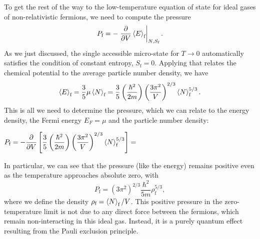 To get the rest of the way to the low-temperature equation of state for ideal gases of non-relativistic fermions, we need to compute the pressure
\begin{equation*}
  P_{\text{f}} = -\left. \frac{\partial }{\partial V} \left\langle E \right\rangle_{\text{f}} \right|_{N, S_{\text{f}}}.
\end{equation*}
As we just discussed, the single accessible micro-state for $T \to 0$ automatically satisfies the condition of constant entropy, $S_{\text{f}} = 0$.
Applying  that relates the chemical potential to the average particle number density, we have
\begin{equation*}
  \left\langle E \right\rangle_{\text{f}} = \frac{3}{5} \mu \left\langle N \right\rangle_{\text{f}} = \frac{3}{5} \left(\frac{\hbar^2}{2m}\right) \left(\frac{3\pi^2}{V}\right)^{2 / 3} \left\langle N \right\rangle_{\text{f}}^{5 / 3}.
\end{equation*}
\newpage %
\noindent This is all we need to determine the pressure, which we can relate to the energy density, the Fermi energy $E_F = \mu$ and the particle number density:
\begin{mdframed}
  $\displaystyle P_{\text{f}} = -\frac{\partial }{\partial V} \left[\frac{3}{5} \left(\frac{\hbar^2}{2m}\right) \left(\frac{3\pi^2}{V}\right)^{2 / 3} \left\langle N \right\rangle_{\text{f}}^{5 / 3}\right] = $ \\[100 pt]
\end{mdframed}
In particular, we can see that the pressure (like the energy) remains positive even as the temperature approaches absolute zero, with
\begin{equation}
  \label{eq:degen_pressure}
  P_{\text{f}} = \left(3\pi^2\right)^{2 / 3} \frac{\hbar^2}{5m} \rho_{\text{f}}^{5 / 3},
\end{equation}
where we define the density $\rho_{\text{f}} = \left\langle N \right\rangle_{\text{f}} / V$.
This positive pressure in the zero-temperature limit is not due to any direct force between the fermions, which remain non-interacting in this ideal gas.
Instead, it is a purely quantum effect resulting from the Pauli exclusion principle.

